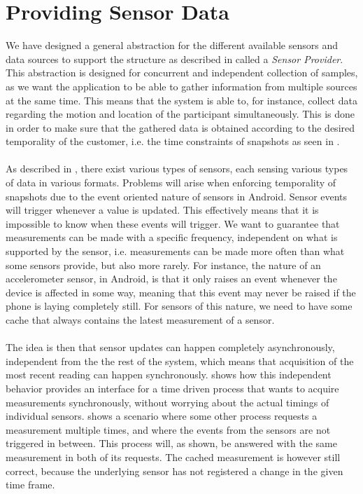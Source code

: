 
\section{Providing Sensor Data}
\label{sec:providing_sensor_data}

We have designed a general abstraction for the different available sensors and data sources to support the structure as described in  called a \emph{Sensor Provider}. This abstraction is designed for concurrent and independent collection of samples, as we want the application to be able to gather information from multiple sources at the same time. This means that the system is able to, for instance, collect data regarding the motion and location of the participant simultaneously. This is done in order to make sure that the gathered data is obtained according to the desired temporality of the customer, i.e. the time constraints of snapshots as seen in .
\\\\
As described in , there exist various types of sensors, each sensing various types of data in various formats. Problems will arise when enforcing temporality of snapshots due to the event oriented nature of sensors in Android. Sensor events will trigger whenever a value is updated. This effectively means that it is impossible to know when these events will trigger. We want to guarantee that measurements can be made with a specific frequency, independent on what is supported by the sensor, i.e. measurements can be made more often than what some sensors provide, but also more rarely. For instance, the nature of an accelerometer sensor, in Android, is that it only raises an event whenever the device is affected in some way, meaning that this event may never be raised if the phone is laying completely still. For sensors of this nature, we need to have some cache that always contains the latest measurement of a sensor. 
\\\\
The idea is then that sensor updates can happen completely asynchronously, independent from the the rest of the system, which means that acquisition of the most recent reading can happen synchronously.  shows how this independent behavior provides an interface for a time driven process that wants to acquire measurements synchronously, without worrying about the actual timings of individual sensors.  shows a scenario where some other process requests a measurement multiple times, and where the events from the sensors are not triggered in between. This process will, as shown, be answered with the same measurement in both of its requests. The cached measurement is however still correct, because the underlying sensor has not registered a change in the given time frame. 
